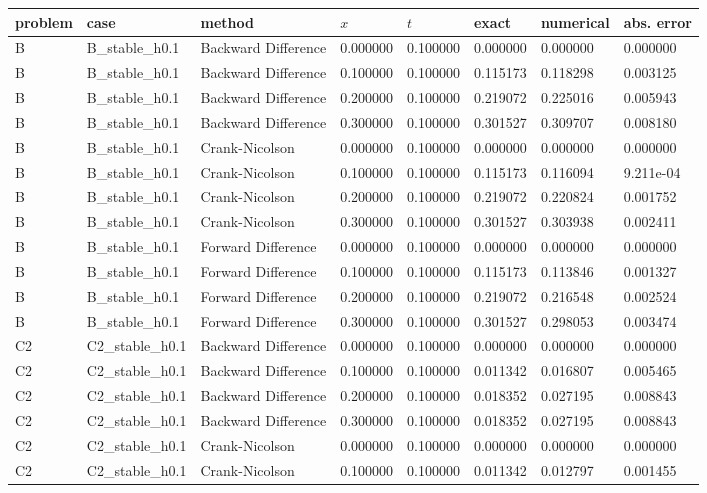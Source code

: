 \begin{tabular}{llllllll}
\toprule
problem & case & method & $x$ & $t$ & exact & numerical & abs. error \\
\midrule
B & B\_stable\_h0.1 & Backward Difference & 0.000000 & 0.100000 & 0.000000 & 0.000000 & 0.000000 \\
B & B\_stable\_h0.1 & Backward Difference & 0.100000 & 0.100000 & 0.115173 & 0.118298 & 0.003125 \\
B & B\_stable\_h0.1 & Backward Difference & 0.200000 & 0.100000 & 0.219072 & 0.225016 & 0.005943 \\
B & B\_stable\_h0.1 & Backward Difference & 0.300000 & 0.100000 & 0.301527 & 0.309707 & 0.008180 \\
B & B\_stable\_h0.1 & Crank-Nicolson & 0.000000 & 0.100000 & 0.000000 & 0.000000 & 0.000000 \\
B & B\_stable\_h0.1 & Crank-Nicolson & 0.100000 & 0.100000 & 0.115173 & 0.116094 & 9.211e-04 \\
B & B\_stable\_h0.1 & Crank-Nicolson & 0.200000 & 0.100000 & 0.219072 & 0.220824 & 0.001752 \\
B & B\_stable\_h0.1 & Crank-Nicolson & 0.300000 & 0.100000 & 0.301527 & 0.303938 & 0.002411 \\
B & B\_stable\_h0.1 & Forward Difference & 0.000000 & 0.100000 & 0.000000 & 0.000000 & 0.000000 \\
B & B\_stable\_h0.1 & Forward Difference & 0.100000 & 0.100000 & 0.115173 & 0.113846 & 0.001327 \\
B & B\_stable\_h0.1 & Forward Difference & 0.200000 & 0.100000 & 0.219072 & 0.216548 & 0.002524 \\
B & B\_stable\_h0.1 & Forward Difference & 0.300000 & 0.100000 & 0.301527 & 0.298053 & 0.003474 \\
C2 & C2\_stable\_h0.1 & Backward Difference & 0.000000 & 0.100000 & 0.000000 & 0.000000 & 0.000000 \\
C2 & C2\_stable\_h0.1 & Backward Difference & 0.100000 & 0.100000 & 0.011342 & 0.016807 & 0.005465 \\
C2 & C2\_stable\_h0.1 & Backward Difference & 0.200000 & 0.100000 & 0.018352 & 0.027195 & 0.008843 \\
C2 & C2\_stable\_h0.1 & Backward Difference & 0.300000 & 0.100000 & 0.018352 & 0.027195 & 0.008843 \\
C2 & C2\_stable\_h0.1 & Crank-Nicolson & 0.000000 & 0.100000 & 0.000000 & 0.000000 & 0.000000 \\
C2 & C2\_stable\_h0.1 & Crank-Nicolson & 0.100000 & 0.100000 & 0.011342 & 0.012797 & 0.001455 \\

\end{tabular}
